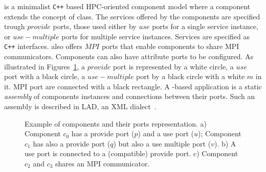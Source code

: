 \llc is a minimalist \texttt{C++} based HPC-oriented component model
where a component extends the concept of class.
The services offered by the components are specified trough $provide$ ports,
those used either by $use$ ports for a single service instance,
or $use-multiple$ ports for multiple service instances.
Services are specified as \texttt{C++} interfaces.
\llc also offers $MPI$ ports that enable components to share MPI communicators.
Components can also have attribute ports to be configured.
%
As illustrated in Figures~\ref{fig:ports}, a $provide$ port is
represented by a white circle, a $use$
port with a black circle, a $use-multiple$ port by a black circle with
a white $m$ in it. MPI port are
connected with a black rectangle.
A \llc-based application is a static \emph{assembly} of components instances and connections between their ports.
Such an assembly is described in LAD, an XML dialect~\cite{l2c}.

\begin{figure}[t]
\begin{center}
\caption{Example of components and their ports representation. a) Component $c_0$ has a provide port ($p$) and a use port ($u$); Component $c_1$ has also a provide port ($q$) but also a use multiple port ($v$). b) A use port is connected to a (compatible) provide port. c) Component $c_2$ and $c_3$ shares an MPI communicator.}
\label{fig:ports}
\end{center}
\end{figure}


